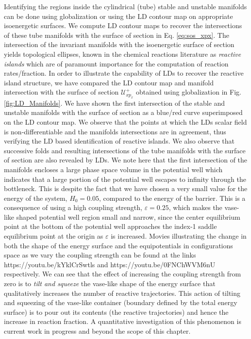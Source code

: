 \documentclass[8pt]{article}
\begin{document}
Identifying the regions inside the cylindrical (tube) stable and unstable manifolds can be done using globalization or using the LD contour map on appropriate isoenergetic surfaces. We compute LD contour maps to recover the intersections of these tube manifolds with the surface of section in Eq. \eqref{eq:sos_xpx}. The intersection of the invariant manifolds with the isoenergetic surface of section yields topological ellipses, known in the chemical reactions literature as \textit{reactive islands} \cite{deleon1991a,deleon1991b,deleon1992,patra2018detecting} which are of paramount importance for the computation of reaction rates/fraction. In order to illustrate the capability of LDs to recover the reactive island structure, we have compared the LD contour map and manifold intersection with the surface of section $\mathcal{U}^{+}_{xp_x}$ obtained using globalization in Fig. \ref{fig:LD_Manifolds}. We have shown the first intersection of the stable and unstable manifolds with the surface of section as a blue/red curve superimposed on the LD contour map. We observe that the points at which the LDs scalar field is non-differentiable and the manifolds intersections are in agreement, thus verifying the LD based identification of reactive islands. We also observe that successive folds and resulting intersections of the tube manifolds with the surface of section are also revealed by LDs. We note here that the first intersection of the manifolds encloses a large phase space volume in the potential well which indicates that a large portion of the potential well escapes to infinity through the bottleneck. This is despite the fact that we have chosen a very small value for the energy of the system, $H_0 = 0.05$, compared to the energy of the barrier. This is a consequence of using a high coupling strength, $\varepsilon = 0.25$, which makes the vase-like shaped potential well region small and narrow, since the center equilibrium point at the bottom of the potential well approaches the index-1 saddle equilibrium point at the origin as $\varepsilon$ is increased. Movies illustrating the change in both the shape of the energy surface and the equipotentials in configurations space as we vary the coupling strength can be found at the links https://youtu.be/kYklCrSwtls and https://youtu.be/0FNChWVM6nU respectively. We can see that the effect of increasing the coupling strength from zero is to \textit{tilt and squeeze} the vase-like shape of the energy surface that qualitatively increases the number of reactive trajectories. This action of tilting and squeezing of the vase-like container (boundary defined by the total energy surface) is to pour out its contents (the reactive trajectories) and hence the increase in reaction fraction. A quantitative investigation of this phenomenon is current work in progress and beyond the scope of this chapter.
\end{document}
